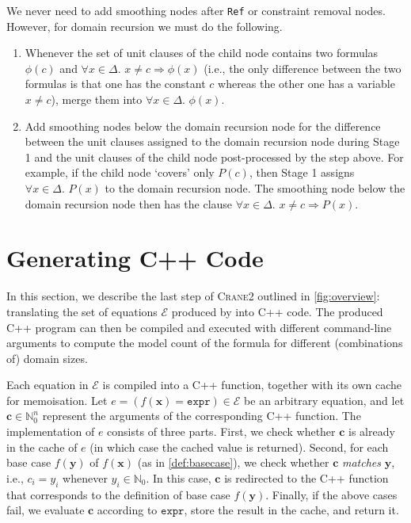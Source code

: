\documentclass{article}
\theoremstyle{definition}
\newcommand{\expr}{\mathtt{expr}}
\newcommand{\Cranetwo}{\textsc{Crane2}}
\begin{document}
We never need to add smoothing nodes after \texttt{Ref} or constraint removal
nodes. However, for domain recursion we must do the following.

\begin{enumerate}
  \item Whenever the set of unit clauses of the child node contains two formulas
        $\phi(c)$ and $\forall x \in \Delta\text{.
        } x \ne c \Rightarrow \phi(x)$ (i.e., the only difference between the
        two formulas is that one has the constant $c$ whereas the other one has
        a variable $x \ne c$), merge them into $\forall x \in \Delta\text{.
        }\phi(x)$.
  \item Add smoothing nodes below the domain recursion node for the difference
        between the unit clauses assigned to the domain recursion node during
        Stage 1 and the unit clauses of the child node post-processed by the
        step above. For example, if the child node `covers' only $P(c)$, then
        Stage 1 assigns $\forall x \in \Delta\text{. }P(x)$ to the domain
        recursion node. The smoothing node below the domain recursion node then
        has the clause $\forall x \in \Delta\text{. } x \ne c \Rightarrow P(x)$.
\end{enumerate}


\section{Generating C++ Code}\label{sec:cpp}

In this section, we describe the last step of \Cranetwo{} outlined in
\cref{fig:overview}: translating the set of equations $\mathcal{E}$ produced by
\CompileWithBaseCases into C++ code. The produced C++ program can then be
compiled and executed with different command-line arguments to compute the model
count of the formula for different (combinations of) domain sizes.

Each equation in $\mathcal{E}$ is compiled into a C++ function, together with
its own cache for memoisation. Let
$e = (f(\mathbf{x}) = \expr{}) \in \mathcal{E}$ be an arbitrary equation, and
let $\mathbf{c} \in \mathbb{N}_{0}^{n}$ represent the arguments of the
corresponding C++ function. The implementation of $e$ consists of three parts.
First, we check whether $\mathbf{c}$ is already in the cache of $e$ (in which
case the cached value is returned). Second, for each base case $f(\mathbf{y})$
of $f(\mathbf{x})$ (as in \cref{def:basecase}), we check whether $\mathbf{c}$
\emph{matches} $\mathbf{y}$, i.e., $c_{i} = y_{i}$ whenever
$y_{i} \in \mathbb{N}_{0}$. In this case, $\mathbf{c}$ is redirected to the C++
function that corresponds to the definition of base case $f(\mathbf{y})$.
Finally, if the above cases fail, we evaluate $\mathbf{c}$ according to
$\expr{}$, store the result in the cache, and return it.
\end{document}
